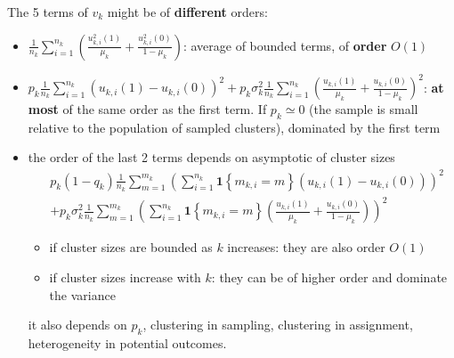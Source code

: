 \documentclass[twoside]{article}
\begin{document}
The 5 terms of $v_k$ might be of \textbf{different} orders: 
\begin{itemize}
    \item $\frac{1}{n_k} \sum^{n_k}_{i=1}\left( \frac{u_{k,i}^2(1)}{\mu_k} + \frac{u^2_{k,i}(0)}{1-\mu_k} \right)$: average of bounded terms, of \textbf{order} $O(1)$
    \item $p_k \frac{1}{n_k} \sum^{n_k}_{i=1}\left(u_{k,i}(1)-u_{k,i}(0)\right)^2 + p_k\sigma^2_k \frac{1}{n_k} \sum^{n_k}_{i=1} \left( \frac{u_{k,i}(1)}{\mu_k} + \frac{u_{k,i}(0)}{1-\mu_k} \right)^2 $: \textbf{at most} of the same order as the first term. If $p_k\simeq 0$ (the sample is small relative to the population of sampled clusters), dominated by the first term
    \item the order of the last 2 terms depends on asymptotic of cluster sizes
    \begin{align*}
        & p_k\left(1-q_k\right) \frac{1}{n_k}\sum^{m_k}_{m=1}\left(\sum^{n_k}_{i=1} \mathbf{1}\left\{m_{k,i}=m\right\} \left(u_{k,i}(1)-u_{k,i}(0)\right) \right)^2\\
    &+ p_k\sigma^2_k \frac{1}{n_k}\sum^{m_k}_{m=1} \left(\sum^{n_k}_{i=1} \mathbf{1}\left\{m_{k,i}=m\right\} \left(\frac{u_{k,i}(1)}{\mu_k} + \frac{u_{k,i}(0)}{1-\mu_k}\right)\right)^2
    \end{align*}
    \begin{itemize}
        \item if cluster sizes are bounded as $k$ increases: they are also order $O(1)$
        \item if cluster sizes increase with $k$: they can be of higher order and dominate the variance
    \end{itemize}
    it also depends on $p_k$, clustering in sampling, clustering in assignment, heterogeneity in potential outcomes.
\end{itemize}
\end{document}
